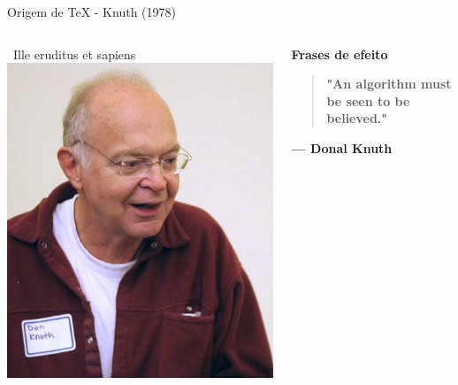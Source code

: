 \documentclass[bigger]{beamer}
\begin{document}
{\begin{frame}[label={sec:orgcc0146d}]{Origem de \TeX{} - Knuth (1978)}
\begin{columns}
\begin{column}{0.48\columnwidth}
\begin{block}{\small{~Ille eruditus et sapiens~}}
\href{img/KnuthAtOpenContentAlliance.jpg}{\includegraphics[width=1.02\textwidth]{./img/KnuthAtOpenContentAlliance.jpg}}
\end{block}
\end{column}

\begin{column}{0.52\columnwidth}
\begin{structureenv} %
\begin{block}{\alert{\textbf{Frases de efeito}}}
\begin{quote}
\textbf{"An algorithm must be seen to be believed."}
\end{quote}
\begin{raggedleft}
\textbf{--- Donal Knuth}
\par\end{raggedleft}


\end{block}
\end{structureenv}
\end{column}
\end{columns}
\end{frame}}
\end{document}
